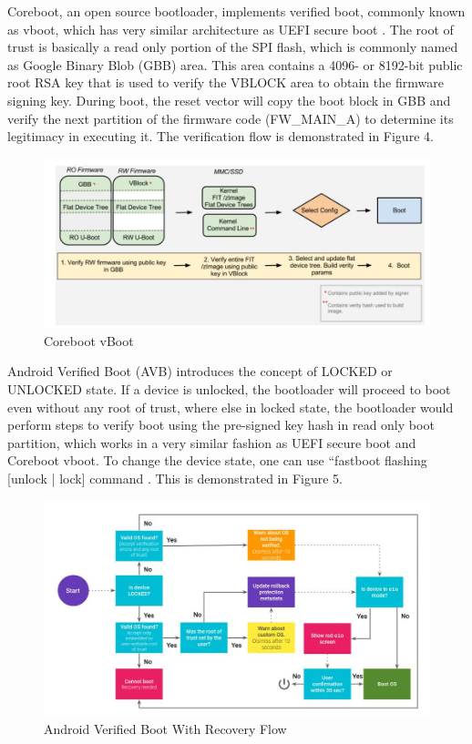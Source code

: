 \documentclass[]{rsos}%
\begin{document}
Coreboot, an open source bootloader, implements verified boot, commonly known as vboot, which has very similar architecture as UEFI secure boot \cite{R5:16}. The root of trust is basically a read only portion of the SPI flash, which is commonly named as Google Binary Blob (GBB) area. This area contains a 4096- or 8192-bit public root RSA key that is used to verify the VBLOCK area to obtain the firmware signing key. During boot, the reset vector will copy the boot block in GBB and verify the next partition of the firmware code (FW\_MAIN\_A) to determine its legitimacy in executing it. The verification flow is demonstrated in Figure 4.
 

\begin{figure}[H]
	\centering
	\includegraphics[width=1\textwidth]{figs/CorebootVboot.JPG}
	\caption{Coreboot vBoot \cite{R5:16}}
\end{figure}

Android Verified Boot (AVB) introduces the concept of LOCKED or UNLOCKED state. If a device is unlocked, the bootloader will proceed to boot even without any root of trust, where else in locked state, the bootloader would perform steps to verify boot using the pre-signed key hash in read only boot partition, which works in a very similar fashion as UEFI secure boot and Coreboot vboot. To change the device state, one can use “fastboot flashing [unlock | lock] command \cite{R5:17}. This is demonstrated in Figure 5.


\begin{figure}[H]
	\centering
	\includegraphics[width=1\textwidth]{figs/AndroidVerifiedBootWithRecoveryFlow.JPG}
	\caption{Android Verified Boot With Recovery Flow \cite{R5:17}}
\end{figure}
\end{document}
